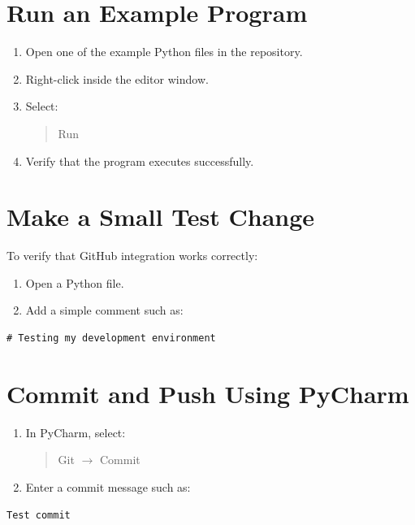\documentclass[11pt]{article}
\begin{document}
\section{Run an Example Program}

\begin{enumerate}
    \item Open one of the example Python files in the repository.

    \item Right-click inside the editor window.

    \item Select:
    \begin{quote}
    Run
    \end{quote}

    \item Verify that the program executes successfully.
\end{enumerate}

\section{Make a Small Test Change}

To verify that GitHub integration works correctly:

\begin{enumerate}
    \item Open a Python file.

    \item Add a simple comment such as:
\end{enumerate}

\begin{lstlisting}
# Testing my development environment
\end{lstlisting}

\section{Commit and Push Using PyCharm}

\begin{enumerate}
    \item In PyCharm, select:
    \begin{quote}
    Git $\rightarrow$ Commit
    \end{quote}

    \item Enter a commit message such as:
\end{enumerate}

\begin{lstlisting}
Test commit
\end{lstlisting}
\end{document}
